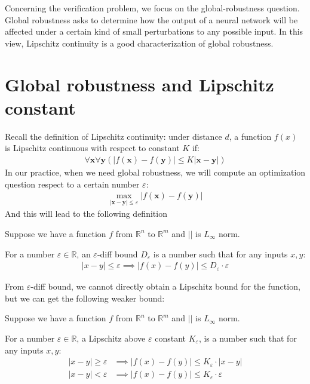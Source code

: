 \documentclass{llncs}
\begin{document}
	Concerning the verification problem, we focus on the global-robustness question. Global robustness asks to determine how the output of a neural network will be affected under a certain kind of small perturbations to any possible input. In this view, Lipschitz continuity is a good characterization of global robustness.
	
	
	
	
	\section{Global robustness and Lipschitz constant}
	
	
	Recall the definition of Lipschitz continuity:
	under distance $d$, a function $f(x)$ is Lipschitz continuous with respect to constant $K$ if:
	\begin{align*}
		\forall \boldsymbol{x} \forall\boldsymbol{y} (|f(\boldsymbol{x}) -f(\boldsymbol{y}) |\leq K|\boldsymbol{x}-\boldsymbol{y}|)
	\end{align*} 
	In our practice, when we need global robustness, we will compute an optimization question respect to a certain number $\varepsilon$:	\begin{align}\label{global_robustness}
		\max_{|\boldsymbol{x}-\boldsymbol{y}| \leq \varepsilon} |f(\boldsymbol{x}) -f(\boldsymbol{y}) |
	\end{align} And this will lead to the following definition

		\begin{definition}
		Suppose we have a function $f$ from $\mathbb{R}^n$ to $\mathbb{R}^m$ and $||$ is $L_\infty$ norm. 
		
		For a number $\varepsilon\in\mathbb{R}$, an $\varepsilon$-diff bound $D_\varepsilon$ is a number such that for any inputs $x,y$: \begin{align*}
			|x-y|\leq \varepsilon \implies |f(x)-f(y)| \leq D_\varepsilon \cdot \varepsilon
		\end{align*}
		
	\end{definition}
	
	From $\varepsilon$-diff bound, we cannot directly obtain a Lipschitz bound for the function, but we can get the following weaker bound:
	
	\begin{definition}
		Suppose we have a function $f$ from $\mathbb{R}^n$ to $\mathbb{R}^m$ and $||$ is $L_\infty$ norm. 
		
		For a number $\varepsilon\in\mathbb{R}$, a Lipschitz above $\varepsilon$ constant  $K_\varepsilon$,  is a number such that for any inputs $x,y$: \begin{align*}
			|x-y|\geq \varepsilon &\implies |f(x)-f(y)| \leq K_\varepsilon \cdot |x-y|\\
			|x-y|<\varepsilon &\implies |f(x)-f(y)| \leq K_\varepsilon \cdot \varepsilon\\
		\end{align*}		
	\end{definition}
	
\end{document}
